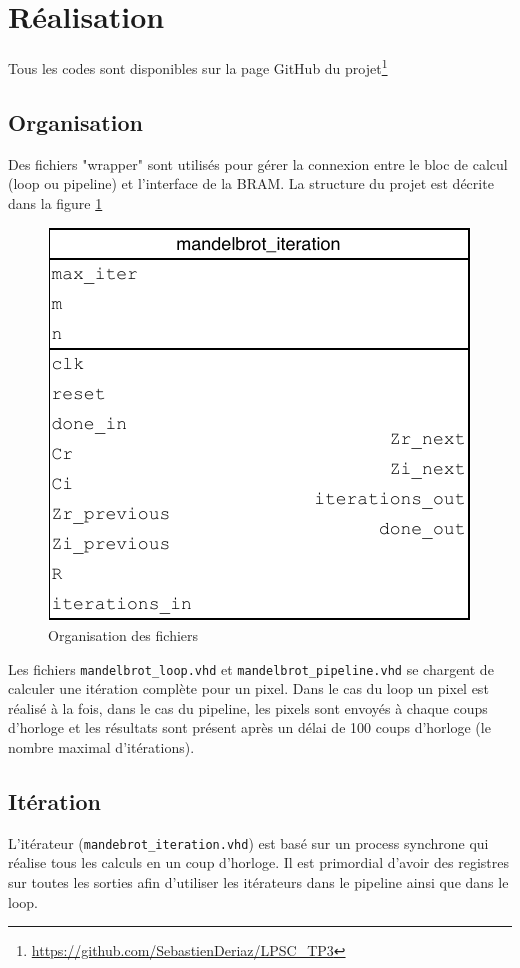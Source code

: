\documentclass[LPSC_Labo03_SDeriaz]{subfiles}
\begin{document}
\section{Réalisation}
Tous les codes sont disponibles sur la page GitHub du projet\footnote{\url{https://github.com/SebastienDeriaz/LPSC_TP3}}
\subsection{Organisation}
Des fichiers "wrapper" sont utilisés pour gérer la connexion entre le bloc de calcul (loop ou pipeline) et l'interface de la BRAM. La structure du projet est décrite dans la figure \ref{fig_fichiers}

\begin{figure}[H]
\centering
\includegraphics[scale=1,page=4]{../Documents/Schemas-crop.pdf}
\caption{Organisation des fichiers}
\label{fig_fichiers}
\end{figure}
Les fichiers \verb!mandelbrot_loop.vhd! et \verb!mandelbrot_pipeline.vhd! se chargent de calculer une itération complète pour un pixel. Dans le cas du loop un pixel est réalisé à la fois, dans le cas du pipeline, les pixels sont envoyés à chaque coups d'horloge et les résultats sont présent après un délai de 100 coups d'horloge (le nombre maximal d'itérations).
\subsection{Itération}
L'itérateur (\verb!mandebrot_iteration.vhd!) est basé sur un process synchrone qui réalise tous les calculs en un coup d'horloge. Il est primordial d'avoir des registres sur toutes les sorties afin d'utiliser les itérateurs dans le pipeline ainsi que dans le loop.
\end{document}
